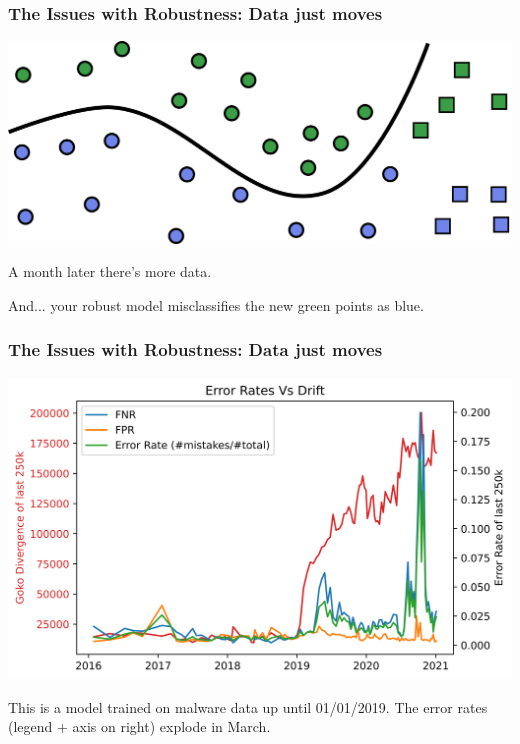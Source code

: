 \documentclass{beamer}
\begin{document}
\begin{frame}
    \frametitle{The Issues with Robustness: Data just moves}
    \begin{center}
        \includegraphics[scale=1.2]{training_2.png}

        A month later there's more data. 
        
        \vspace*{20pt}
        And... your robust model misclassifies the new green points as blue. 
    \end{center}
\end{frame}

\begin{frame}
    \frametitle{The Issues with Robustness: Data just moves}
    \begin{center}
        \includegraphics[scale=0.6]{overall_vs_error.png}

        This is a model trained on malware data up until 01/01/2019. The error rates (legend + axis on right) explode in March. \cite{BayesianCovertreeICLR}
    \end{center}
\end{frame}
\end{document}
